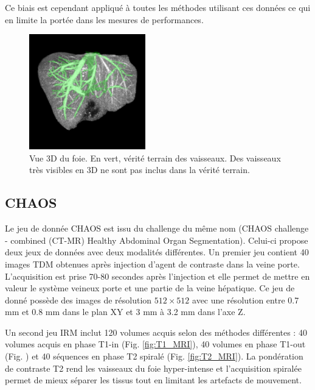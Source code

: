 Ce biais est cependant appliqué à toutes les méthodes utilisant ces données ce qui en limite la portée dans les mesures de performances.

\begin{figure}
    \centering
    \includegraphics[height=5cm]{Images/missing_annotations.png}
    \caption{Vue 3D du foie. En vert, vérité terrain des vaisseaux. Des vaisseaux très visibles en 3D ne sont pas inclus dans la vérité terrain.}
    \label{fig:missing_annotations}
\end{figure}

\subsection{CHAOS}

Le jeu de donnée CHAOS est issu du challenge du même nom (CHAOS challenge - combined (CT-MR) Healthy Abdominal Organ Segmentation). Celui-ci propose deux jeux de données avec deux modalités différentes. Un premier jeu contient 40 images TDM obtenues après injection d'agent de contraste dans la veine porte. L'acquisition est prise 70-80 secondes après l'injection et elle permet de mettre en valeur le système veineux porte et une partie de la veine hépatique. Ce jeu de donné possède des images de résolution $512\times 512$ avec une résolution entre 0.7 mm et 0.8 mm dans le plan XY et 3 mm à 3.2 mm dans l'axe Z.

Un second jeu IRM inclut 120 volumes acquis selon des méthodes différentes : 40 volumes acquis en phase T1-in (Fig. \ref{fig:T1_MRI}), 40 volumes  en phase T1-out (Fig. \cite{fig:T1_MRI}) et 40 séquences en phase T2 spiralé (Fig. \ref{fig:T2_MRI}). La pondération de contraste T2 rend les vaisseaux du foie hyper-intense et l'acquisition spiralée permet de mieux séparer les tissus tout en limitant les artefacts de mouvement.

